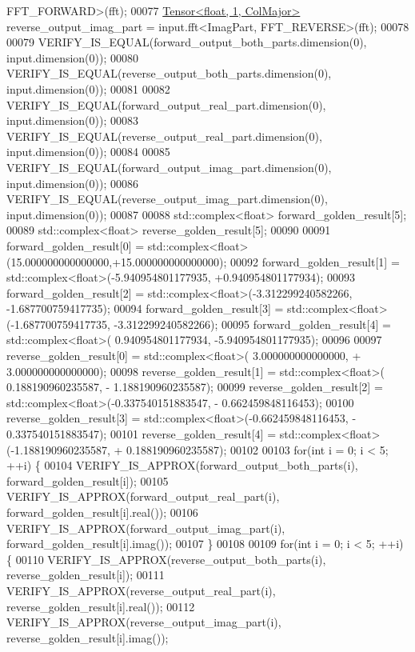 \begin{DoxyCode}
      FFT\_FORWARD>(fft);
00077   \hyperlink{class_eigen_1_1_tensor}{Tensor<float, 1, ColMajor>} reverse\_output\_imag\_part = input.fft<ImagPart, 
      FFT\_REVERSE>(fft);
00078 
00079   VERIFY\_IS\_EQUAL(forward\_output\_both\_parts.dimension(0), input.dimension(0));
00080   VERIFY\_IS\_EQUAL(reverse\_output\_both\_parts.dimension(0), input.dimension(0));
00081 
00082   VERIFY\_IS\_EQUAL(forward\_output\_real\_part.dimension(0), input.dimension(0));
00083   VERIFY\_IS\_EQUAL(reverse\_output\_real\_part.dimension(0), input.dimension(0));
00084 
00085   VERIFY\_IS\_EQUAL(forward\_output\_imag\_part.dimension(0), input.dimension(0));
00086   VERIFY\_IS\_EQUAL(reverse\_output\_imag\_part.dimension(0), input.dimension(0));
00087 
00088   std::complex<float> forward\_golden\_result[5];
00089   std::complex<float> reverse\_golden\_result[5];
00090 
00091   forward\_golden\_result[0] = std::complex<float>(15.000000000000000,+15.000000000000000);
00092   forward\_golden\_result[1] = std::complex<float>(-5.940954801177935, +0.940954801177934);
00093   forward\_golden\_result[2] = std::complex<float>(-3.312299240582266, -1.687700759417735);
00094   forward\_golden\_result[3] = std::complex<float>(-1.687700759417735, -3.312299240582266);
00095   forward\_golden\_result[4] = std::complex<float>( 0.940954801177934, -5.940954801177935);
00096 
00097   reverse\_golden\_result[0] = std::complex<float>( 3.000000000000000, + 3.000000000000000);
00098   reverse\_golden\_result[1] = std::complex<float>( 0.188190960235587, - 1.188190960235587);
00099   reverse\_golden\_result[2] = std::complex<float>(-0.337540151883547, - 0.662459848116453);
00100   reverse\_golden\_result[3] = std::complex<float>(-0.662459848116453, - 0.337540151883547);
00101   reverse\_golden\_result[4] = std::complex<float>(-1.188190960235587, + 0.188190960235587);
00102 
00103   \textcolor{keywordflow}{for}(\textcolor{keywordtype}{int} i = 0; i < 5; ++i) \{
00104     VERIFY\_IS\_APPROX(forward\_output\_both\_parts(i), forward\_golden\_result[i]);
00105     VERIFY\_IS\_APPROX(forward\_output\_real\_part(i), forward\_golden\_result[i].real());
00106     VERIFY\_IS\_APPROX(forward\_output\_imag\_part(i), forward\_golden\_result[i].imag());
00107   \}
00108 
00109   \textcolor{keywordflow}{for}(\textcolor{keywordtype}{int} i = 0; i < 5; ++i) \{
00110     VERIFY\_IS\_APPROX(reverse\_output\_both\_parts(i), reverse\_golden\_result[i]);
00111     VERIFY\_IS\_APPROX(reverse\_output\_real\_part(i), reverse\_golden\_result[i].real());
00112     VERIFY\_IS\_APPROX(reverse\_output\_imag\_part(i), reverse\_golden\_result[i].imag());

\end{DoxyCode}
